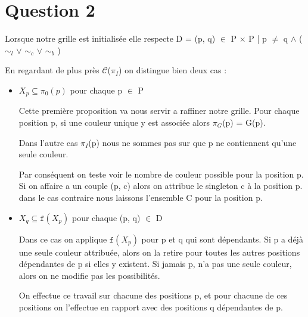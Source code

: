 
\section{Question 2}

Lorsque notre grille est initialis\'ee elle respecte D = {(p, q) $\in$ P $\times$ P | p $\neq$ q $\wedge$ ( $\sim_{l}$ $\vee$ $\sim_{c}$ $\vee$ $\sim_{b}$ )}

En regardant de plus pr\`es $\mathcal{C}$($\pi_I$) on distingue bien deux cas :

\bigskip
\begin{itemize}
\item $X_p \subseteq \pi_0(p)$ pour chaque p $\in$ P

Cette premi\`ere proposition va nous servir a raffiner notre grille. Pour chaque position p, si une couleur unique y est associ\'ee alors $\pi_G$(p) = {G(p)}.


Dans l'autre cas $\pi_I$(p)  nous ne sommes pas sur que p ne contiennent qu'une seule couleur.  

\bigskip
Par cons\'equent on teste voir le nombre de couleur possible pour la position p. Si on affaire a un couple {(p, c)} alors on attribue le singleton {c} \`a la position p. dans le cas contraire nous laissons l'ensemble C pour la position p.

\bigskip
\item $X_q \subseteq \mathtt{f} (X_p)$ pour chaque (p, q) $\in$ D

Dans ce cas on applique $\mathtt{f} (X_p)$ pour p et q qui sont d\'ependants. Si p a d\'ej\`a une seule couleur attribu\'ee, alors on la retire pour toutes les autres positions d\'ependantes de p si elles y existent. Si jamais p, n'a pas une seule couleur, alors on ne modifie pas les possibilit\'es. 

\bigskip
On effectue ce travail sur chacune des positions p, et pour chacune de ces positions on l'effectue en rapport avec des positions q d\'ependantes de p.
\end{itemize}